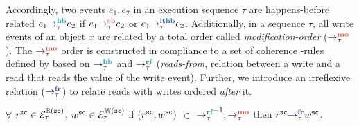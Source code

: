Accordingly, two events $e_1,e_2$ in an execution sequence $\tau$ are happens-before 
related \ie
$\hb{\tau}{e_1}{e_2}$ if $\seqb{\tau}{e_1}{e_2}$ or $\ithb{\tau}{e_1}{e_2}$.
%
Additionally, in a sequence $\tau$, all write events of an object $x$ are related by a 
total order called {\em modification-order} ($\setMO$).
%
The $\setMO$ order is constructed in compliance to a set of coherence
\lmo-rules defined by \cc \cite{C11}
 based on $\setHB$ and $\setRF$ ({\em reads-from}, 
relation between a write and a read that reads the value of the write event). 
%
Further, we introduce an irreflexive relation  ($\setFR$) to relate  
\sc reads with \sc writes ordered {\em after} it.

\begin{definition}\newline
	$\forall$ $r^\sc \in \ordreads{\sc}_\tau$, $w^\sc \in \ordwrites{\sc}_\tau$
	if $(r^\sc,w^\sc)$ $\in$ $\setRF^{-1};\setMO$ then $\fr{\tau}{r^\sc}{w^\sc}$.
\end{definition}

